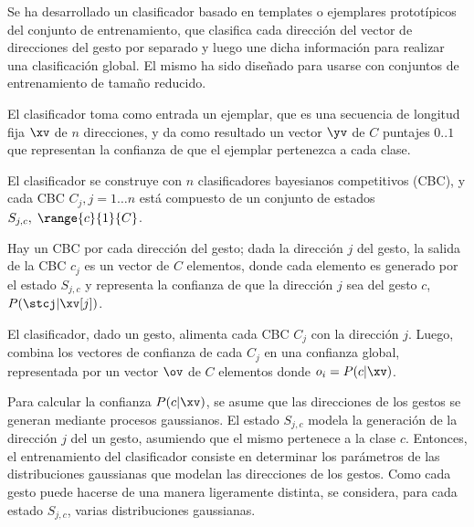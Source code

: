 \newcommand{\mijc}{\ve{I_{j,c}}}


Se ha desarrollado un clasificador basado en templates o ejemplares prototípicos del conjunto de entrenamiento, que clasifica cada dirección del vector de direcciones del gesto por separado y luego une dicha información para realizar una clasificación global. El mismo ha sido diseñado para usarse con conjuntos de entrenamiento de tamaño reducido. 

El clasificador toma como entrada un ejemplar, que es una secuencia de longitud fija $\xv$ de $n$ direcciones, y da como resultado un vector $\yv$ de $C$ puntajes $0..1$ que representan la confianza de que el ejemplar pertenezca a cada clase. 


El clasificador se construye con $n$ clasificadores bayesianos competitivos (CBC), y cada CBC $C_j, j=1 \dots n$ está compuesto de un conjunto de estados $S_{j,c}, \; \range{c}{1}{C}$. 



Hay un CBC por cada dirección del gesto; dada la dirección $j$ del gesto, la salida de la CBC $c_j$ es un vector de $C$ elementos, donde cada elemento es generado por el estado $S_{j,c}$ y representa la confianza de que la dirección $j$ sea del gesto $c$, $P(\stcj | \xv[j])$. 




El clasificador, dado un gesto, alimenta cada CBC $C_j$ con la dirección $j$. Luego, combina los vectores de confianza de cada $C_j$ en una confianza global, representada por un vector $\ov$ de $C$ elementos donde $o_i=P ( c | \xv )$.




Para calcular la confianza $P( c | \xv )$, se asume que las direcciones de los gestos se generan mediante procesos gaussianos. El estado $S_{j,c}$ modela la generación de la dirección $j$ del un gesto, asumiendo que el mismo pertenece a la clase $c$. Entonces, el entrenamiento del clasificador consiste en determinar los parámetros de las distribuciones gaussianas que modelan las direcciones de los gestos. Como cada gesto puede hacerse de una manera ligeramente distinta, se considera, para cada estado $S_{j,c}$, varias distribuciones gaussianas.

